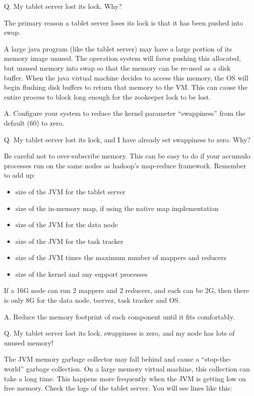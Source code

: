 Q. My tablet server lost its lock.  Why?

The primary reason a tablet server loses its lock is that it has been pushed into swap.

A large java program (like the tablet server) may have a large portion
of its memory image unused.  The operation system will favor pushing
this allocated, but unused memory into swap so that the memory can be
re-used as a disk buffer.  When the java virtual machine decides to
access this memory, the OS will begin flushing disk buffers to return that
memory to the VM.  This can cause the entire process to block long
enough for the zookeeper lock to be lost.

A. Configure your system to reduce the kernel parameter ``swappiness'' from the default (60) to zero.

Q. My tablet server lost its lock, and I have already set swappiness to
zero.  Why?

Be careful not to over-subscribe memory.  This can be easy to do if
your accumulo processes run on the same nodes as hadoop's map-reduce
framework.  Remember to add up:

\begin{itemize}
\item{size of the JVM for the tablet server}
\item{size of the in-memory map, if using the native map implementation}
\item{size of the JVM for the data node}
\item{size of the JVM for the task tracker}
\item{size of the JVM times the maximum number of mappers and reducers}
\item{size of the kernel and any support processes}
\end{itemize}

If a 16G node can run 2 mappers and 2 reducers, and each can be 2G,
then there is only 8G for the data node, tserver, task tracker and OS.

A. Reduce the memory footprint of each component until it fits comfortably.

Q. My tablet server lost its lock, swappiness is zero, and my node has lots of unused memory!

The JVM memory garbage collector may fall behind and cause a
``stop-the-world'' garbage collection. On a large memory virtual
machine, this collection can take a long time.  This happens more
frequently when the JVM is getting low on free memory.  Check the logs
of the tablet server.  You will see lines like this:

